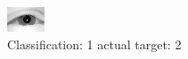 \begin{figure}[h!]
\begin{center}
\includegraphics[width=0.60\columnwidth]{figures/ID2274_class_1_target_2.png}
\end{center}
\caption{ Classification: 1 actual target: 2}
\label{fig:ID2274_class_1_target_2}
\end{figure}
